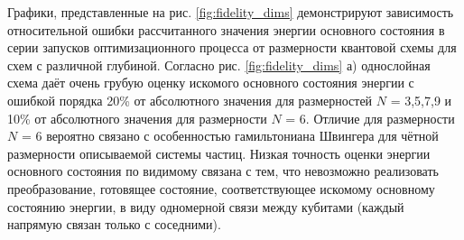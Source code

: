 \documentclass[14pt]{extarticle}
\begin{document}
\qquad Графики, представленные на рис. \ref{fig:fidelity_dims} демонстрируют зависимость относительной ошибки рассчитанного значения энергии основного состояния в серии запусков оптимизационного процесса от размерности квантовой схемы для схем с различной глубиной. Согласно рис. \ref{fig:fidelity_dims} а) однослойная схема даёт очень грубую оценку искомого основного состояния энергии с ошибкой порядка 20\% от абсолютного значения для размерностей $N$ = 3,5,7,9 и 10\% от абсолютного значения для размерности $N$ = 6. Отличие для размерности $N$ = 6 вероятно связано с особенностью гамильтониана Швингера для чётной размерности описываемой системы частиц. Низкая точность оценки энергии основного состояния по видимому связана с тем, что невозможно реализовать преобразование, готовящее состояние, соответствующее искомому основному состоянию энергии, в виду одномерной связи между кубитами (каждый напрямую связан только с соседними).
\end{document}

